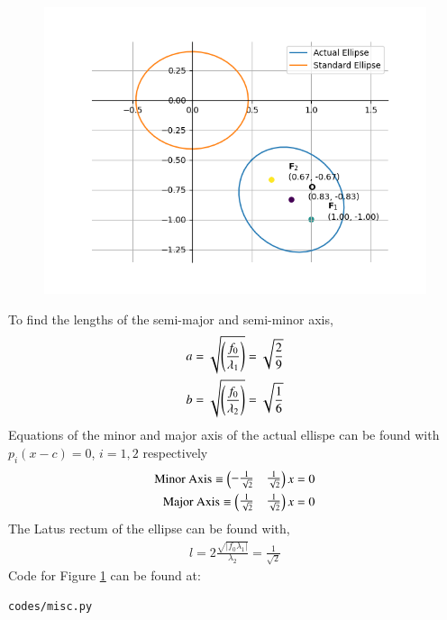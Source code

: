 \documentclass[journal]{IEEEtran}
\begin{document}
\begin{figure}[H]
	\centering
	\includegraphics[width=0.8\columnwidth]{Figures/fig1.png} 
	\caption{}
	\label{fig1}
\end{figure} 
To find the lengths of the semi-major and semi-minor axis, 
\begin{align}
	a &= \sqrt{\left(\frac{f_0}{\lambda_1}\right)} =  \sqrt{\frac{2}{9}}\\
	b &= \sqrt{\left(\frac{f_0}{\lambda_2}\right)} = \sqrt{\frac{1}{6}}
\end{align}
Equations of the minor and major axis of the actual ellispe can be found with $p_i(x - c) = 0$, $i = 1, 2$ respectively \\ 
\begin{align}
	\text{Minor Axis} \equiv   \begin{pmatrix}- \frac{1}{\sqrt{2}} & \frac{1}{\sqrt{2}}\end{pmatrix}x = 0\\
	\text{Major Axis} \equiv   \begin{pmatrix}\frac{1}{\sqrt{2}} & \frac{1}{\sqrt{2}}\end{pmatrix}x = 0
\end{align}
The Latus rectum of the ellipse can be found with,
\begin{align}
	l = 2\frac{\sqrt{|f_0 \lambda_1|}}{\lambda_2} = \frac{1}{\sqrt{2}}
\end{align}
Code for Figure \ref{fig1} can be found at:
\begin{lstlisting}
codes/misc.py
\end{lstlisting}
\end{document}
